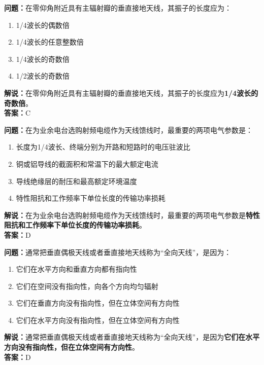 \textbf{问题：}在零仰角附近具有主辐射瓣的垂直接地天线，其振子的长度应为：

\begin{enumerate}[label=\Alph*), leftmargin=1.5cm]
	\item 1/4波长的偶数倍
	\item 1/4波长的任意整数倍
	\item 1/4波长的奇数倍
	\item 1/2波长的奇数倍
\end{enumerate}

\textbf{解说：}在零仰角附近具有主辐射瓣的垂直接地天线，其振子的长度应为\textbf{1/4波长的奇数倍}。\\\textbf{答案：}C%



\textbf{问题：}在为业余电台选购射频电缆作为天线馈线时，最重要的两项电气参数是：

\begin{enumerate}[label=\Alph*), leftmargin=1.5cm]
	\item 长度为1/4波长、终端分别为开路和短路时的电压驻波比
	\item 铜或铝导线的截面积和常温下的最大额定电流
	\item 导线绝缘层的耐压和最高额定环境温度
	\item 特性阻抗和工作频率下单位长度的传输功率损耗
\end{enumerate}

\textbf{解说：}在为业余电台选购射频电缆作为天线馈线时，最重要的两项电气参数是\textbf{特性阻抗和工作频率下单位长度的传输功率损耗}。\\\textbf{答案：}D%



\textbf{问题：}通常把垂直偶极天线或者垂直接地天线称为“全向天线”，是因为：

\begin{enumerate}[label=\Alph*), leftmargin=1.5cm]
	\item 它们在水平方向和垂直方向都有指向性
	\item 它们在空间没有指向性，向各个方向均匀辐射
	\item 它们在垂直方向没有指向性，但在立体空间有方向性
	\item 它们在水平方向没有指向性，但在立体空间有方向性
\end{enumerate}

\textbf{解说：}通常把垂直偶极天线或者垂直接地天线称为“全向天线”，是因为\textbf{它们在水平方向没有指向性，但在立体空间有方向性}。\\\textbf{答案：}D%



